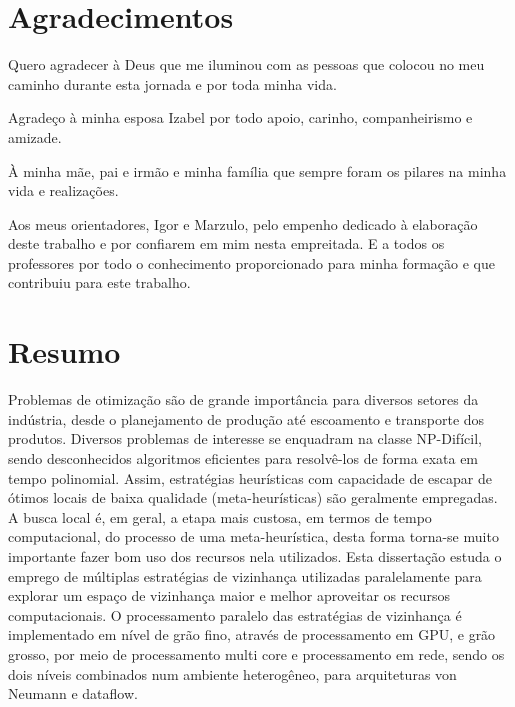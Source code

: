 \chapter*{Agradecimentos}

Quero agradecer à Deus que me iluminou com as pessoas que colocou no meu caminho durante esta jornada e por toda minha vida.

Agradeço à minha esposa Izabel por todo apoio, carinho, companheirismo e amizade.

À minha mãe, pai e irmão e minha família que sempre foram os pilares na minha vida e realizações.

Aos meus orientadores, Igor e Marzulo, pelo empenho dedicado à elaboração deste trabalho e por confiarem em mim nesta empreitada.
E a todos os professores por todo o conhecimento proporcionado para minha formação e que contribuiu para este trabalho.


\chapter*{Resumo}

Problemas de otimização são de grande importância para diversos setores da indústria, desde o planejamento de produção até escoamento e transporte dos produtos.
Diversos problemas de interesse se enquadram na classe NP-Difícil, sendo desconhecidos algoritmos eficientes para resolvê-los de forma exata em tempo polinomial.
Assim, estratégias heurísticas com capacidade de escapar de ótimos locais de baixa qualidade (meta-heurísticas) são geralmente empregadas. %
A busca local é, em geral, a etapa mais custosa, em termos de tempo computacional, do processo de uma meta-heurística, desta forma torna-se muito importante fazer bom uso dos recursos nela utilizados.
Esta dissertação estuda o emprego de múltiplas estratégias de vizinhança utilizadas paralelamente para explorar um espaço de vizinhança maior e melhor aproveitar os recursos computacionais.
O processamento paralelo das estratégias de vizinhança é implementado em nível de grão fino, através de processamento em GPU, e grão grosso, por meio de processamento multi core e processamento em rede, sendo os dois níveis combinados num ambiente heterogêneo, %
para arquiteturas von Neumann e dataflow. %

